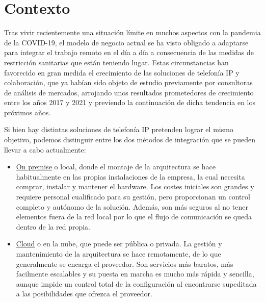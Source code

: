 \documentclass[a4paper, 12pt]{book}
\begin{document}
\section{Contexto}
Tras vivir recientemente una situación límite en muchos aspectos con la pandemia de la COVID-19, el modelo de negocio actual se ha visto obligado a adaptarse para integrar el trabajo remoto en el día a día a consecuencia de las medidas de restricción sanitarias que están teniendo lugar.
Estas circunstancias han favorecido en gran medida el crecimiento de las soluciones de telefonía IP y colaboración, que ya habían sido objeto de estudio previamente por consultoras de análisis de mercados, %
arrojando unos resultados prometedores de crecimiento entre los años 2017 y 2021 y previendo la continuación de dicha tendencia en los próximos años.

Si bien hay distintas soluciones de telefonía IP pretenden lograr el mismo objetivo, podemos distinguir entre los dos métodos de integración que se pueden llevar a cabo actualmente:
\begin{itemize}
  \renewcommand{\theenumi}{\alph{enumi}}
  \item \underline{On premise} o local, donde el montaje de la arquitectura se hace habitualmente en las propias instalaciones de la empresa, la cual necesita comprar, instalar y mantener el hardware. Los costes iniciales son grandes y requiere personal cualificado para su gestión, pero proporcionan un control completo y autónomo de la solución. Además, son más seguros al no tener elementos fuera de la red local por lo que el flujo de comunicación se queda dentro de la red propia.  

  \item \underline{Cloud} o en la nube, que puede ser pública o privada. La gestión y mantenimiento de la arquitectura se hace remotamente, de lo que generalmente se encarga el proveedor. Son servicios más baratos, más facilmente escalables y su puesta en marcha es mucho más rápida y sencilla, aunque impide un control total de la configuración al encontrarse supeditada a las posibilidades que ofrezca el proveedor.
\end{itemize}
\end{document}
